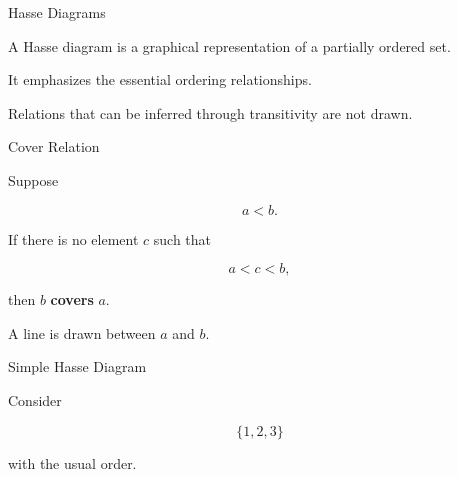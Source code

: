\documentclass[aspectratio=169,11pt]{beamer}
\begin{document}

\begin{frame}{Hasse Diagrams}

A Hasse diagram is a graphical representation of a
partially ordered set.

\vspace{0.35cm}

It emphasizes the essential ordering relationships.

\vspace{0.35cm}

Relations that can be inferred through transitivity
are not drawn.

\end{frame}


\begin{frame}{Cover Relation}

Suppose

\[
a<b.
\]

If there is no element $c$ such that

\[
a<c<b,
\]

then $b$ \textbf{covers} $a$.

\vspace{0.35cm}

A line is drawn between $a$ and $b$.

\end{frame}


\begin{frame}{Simple Hasse Diagram}

Consider

\[
\{1,2,3\}
\]

with the usual order.

\vspace{0.2cm}

\begin{center}


\end{center}

\end{frame}
\end{document}
